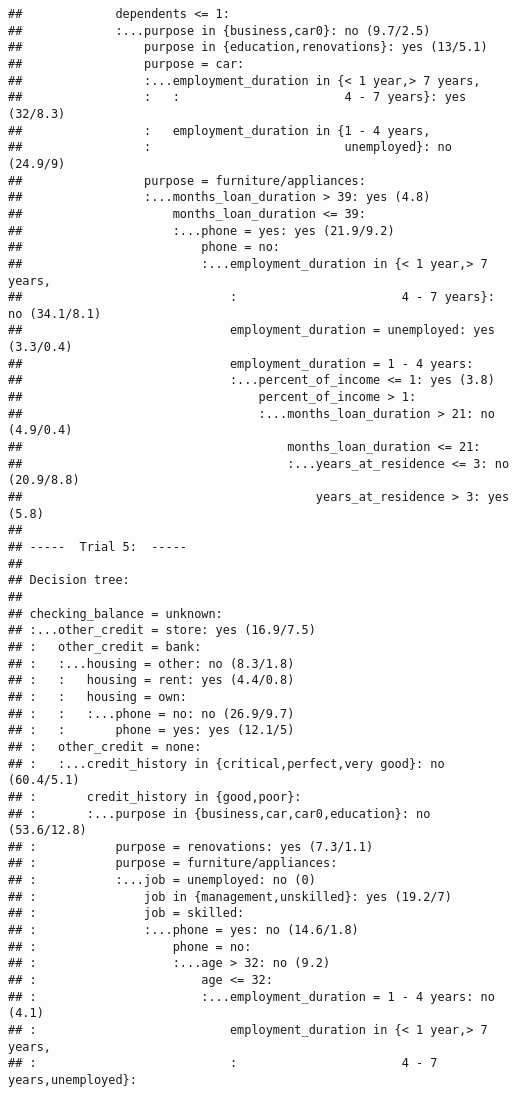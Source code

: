 \documentclass[
]{article}
\begin{document}
\begin{verbatim}
##             dependents <= 1:
##             :...purpose in {business,car0}: no (9.7/2.5)
##                 purpose in {education,renovations}: yes (13/5.1)
##                 purpose = car:
##                 :...employment_duration in {< 1 year,> 7 years,
##                 :   :                       4 - 7 years}: yes (32/8.3)
##                 :   employment_duration in {1 - 4 years,
##                 :                           unemployed}: no (24.9/9)
##                 purpose = furniture/appliances:
##                 :...months_loan_duration > 39: yes (4.8)
##                     months_loan_duration <= 39:
##                     :...phone = yes: yes (21.9/9.2)
##                         phone = no:
##                         :...employment_duration in {< 1 year,> 7 years,
##                             :                       4 - 7 years}: no (34.1/8.1)
##                             employment_duration = unemployed: yes (3.3/0.4)
##                             employment_duration = 1 - 4 years:
##                             :...percent_of_income <= 1: yes (3.8)
##                                 percent_of_income > 1:
##                                 :...months_loan_duration > 21: no (4.9/0.4)
##                                     months_loan_duration <= 21:
##                                     :...years_at_residence <= 3: no (20.9/8.8)
##                                         years_at_residence > 3: yes (5.8)
## 
## -----  Trial 5:  -----
## 
## Decision tree:
## 
## checking_balance = unknown:
## :...other_credit = store: yes (16.9/7.5)
## :   other_credit = bank:
## :   :...housing = other: no (8.3/1.8)
## :   :   housing = rent: yes (4.4/0.8)
## :   :   housing = own:
## :   :   :...phone = no: no (26.9/9.7)
## :   :       phone = yes: yes (12.1/5)
## :   other_credit = none:
## :   :...credit_history in {critical,perfect,very good}: no (60.4/5.1)
## :       credit_history in {good,poor}:
## :       :...purpose in {business,car,car0,education}: no (53.6/12.8)
## :           purpose = renovations: yes (7.3/1.1)
## :           purpose = furniture/appliances:
## :           :...job = unemployed: no (0)
## :               job in {management,unskilled}: yes (19.2/7)
## :               job = skilled:
## :               :...phone = yes: no (14.6/1.8)
## :                   phone = no:
## :                   :...age > 32: no (9.2)
## :                       age <= 32:
## :                       :...employment_duration = 1 - 4 years: no (4.1)
## :                           employment_duration in {< 1 year,> 7 years,
## :                           :                       4 - 7 years,unemployed}:

\end{verbatim}
\end{document}
